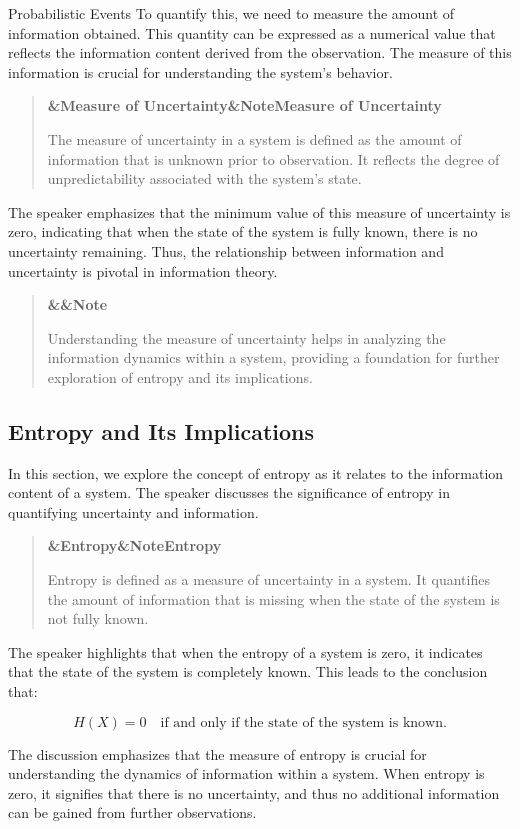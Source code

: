 \documentclass[a4paper]{article}
\newcommand{\boxheading}[1]{%
  \par\smallskip
  \noindent\textbf{\ifx&#1&Note\else#1\fi}\par
  \smallskip
}
\newenvironment{defbox}[1][]{%
  \begin{quote}\color{green!40!black}\boxheading{#1}\normalcolor
}{\end{quote}}
\newenvironment{rembox}[1][]{%
  \begin{quote}\color{black!70}\boxheading{#1}\normalcolor
}{\end{quote}}
\begin{document}
\begin{section}{Probabilistic Events}
To quantify this, we need to measure the amount of information obtained. This quantity can be expressed as a numerical value that reflects the information content derived from the observation. The measure of this information is crucial for understanding the system's behavior.

\begin{defbox}[Measure of Uncertainty]
The measure of uncertainty in a system is defined as the amount of information that is unknown prior to observation. It reflects the degree of unpredictability associated with the system's state.
\end{defbox}

The speaker emphasizes that the minimum value of this measure of uncertainty is zero, indicating that when the state of the system is fully known, there is no uncertainty remaining. Thus, the relationship between information and uncertainty is pivotal in information theory.

\begin{rembox}
Understanding the measure of uncertainty helps in analyzing the information dynamics within a system, providing a foundation for further exploration of entropy and its implications.
\end{rembox}

\subsection{Entropy and Its Implications}
In this section, we explore the concept of entropy as it relates to the information content of a system. The speaker discusses the significance of entropy in quantifying uncertainty and information.

\begin{defbox}[Entropy]
Entropy is defined as a measure of uncertainty in a system. It quantifies the amount of information that is missing when the state of the system is not fully known.
\end{defbox}

The speaker highlights that when the entropy of a system is zero, it indicates that the state of the system is completely known. This leads to the conclusion that:

\begin{equation}
H(X) = 0 \quad \text{if and only if the state of the system is known.}
\end{equation}

The discussion emphasizes that the measure of entropy is crucial for understanding the dynamics of information within a system. When entropy is zero, it signifies that there is no uncertainty, and thus no additional information can be gained from further observations.


\end{section}
\end{document}
